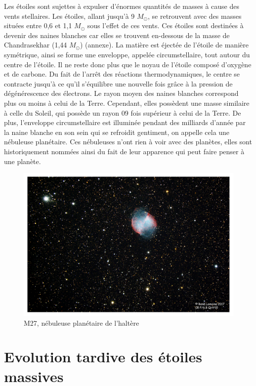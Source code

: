 Les étoiles sont sujettes à expulser d’énormes quantités de masses à cause des vents stellaires. Les étoiles, allant jusqu’à 9 $M_\odot$, se retrouvent avec des masses situées entre 0,6 et 1,1 $M_\odot$ sous l’effet de ces vents. Ces étoiles sont destinées à devenir des naines blanches car elles se trouvent en-dessous de la masse de Chandrasekhar (1,44 $M_\odot$) (annexe). La matière est éjectée de l’étoile de manière symétrique, ainsi se forme une enveloppe, appelée circumstellaire, tout autour du centre de l’étoile. Il ne reste donc plus que le noyau de l’étoile composé d’oxygène et de carbone. Du fait de l’arrêt des réactions thermodynamiques, le centre se contracte jusqu’à ce qu’il s’équilibre une nouvelle fois grâce à la pression de dégénérescence des électrons. Le rayon moyen des naines blanches correspond plus ou moins à celui de la Terre. Cependant, elles possèdent une masse similaire à celle du Soleil, qui possède un rayon 09 fois supérieur à celui de la Terre. De plus, l’enveloppe circumstellaire est illuminée pendant des milliards d’année par la naine blanche en son sein qui se refroidit gentiment, on appelle cela une nébuleuse planétaire. Ces nébuleuses n’ont rien à voir avec des planètes, elles sont historiquement nommées ainsi du fait de leur apparence qui peut faire penser à une planète.\newpage 

\begin{figure}[H]\vspace{1cm}
	\centering
	\includegraphics[scale=0.4]{images/m27}
	\caption{M27, nébuleuse planétaire de l'haltère}
\end{figure}\bigskip  

\section{Evolution tardive des étoiles massives}\medskip

